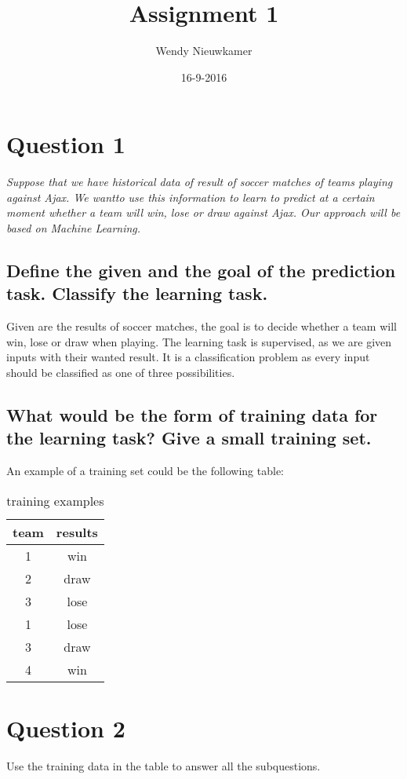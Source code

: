 \documentclass[12pt, a4paper]{article}
\title {Assignment 1}
\date{16-9-2016}
\author{Wendy Nieuwkamer}
\begin{document}
\maketitle

\section{Question 1}
\textit{Suppose that we have historical data of result of soccer matches of teams playing against Ajax. We wantto
use this information to learn to predict at a certain moment whether a team will win, lose or draw against
Ajax. Our approach will be based on Machine Learning.}

	\subsection{Define the given and the goal of the prediction task.
	Classify the learning task.}
	
	Given are the results of soccer matches, the goal is to decide whether a team will win, lose or draw when playing. 
	The learning task is supervised, as we are given inputs with their wanted result. It is a classification problem as 
	every input should be classified as one of three possibilities.
	
	
	\subsection{What would be the form of training data for the learning task? Give a small training set.}
	An example of a training set could be the following table:
	
	\begin{table}
	\centering
	\begin{tabular}{c|c}
	   team & results \\
	   \hline
	   1 & win\\
	   2 & draw\\
	   3 & lose\\
	   1 & lose\\ 
	   3 & draw\\
	   4 & win\\
	\end{tabular}
	\caption{training examples}
	\end{table}

\pagebreak

\section{Question 2}
Use the training data in the table to answer all the subquestions. 
\end{document}
